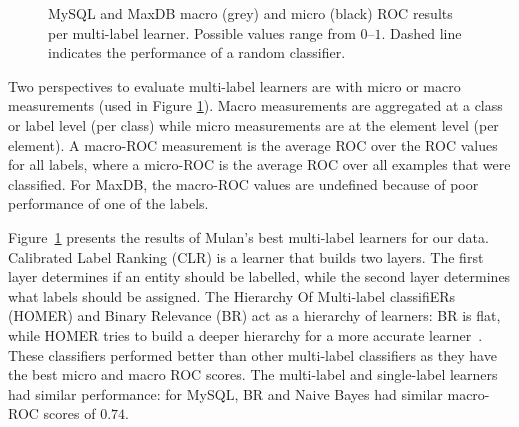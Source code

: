 \documentclass[smallextended]{svjour3}       %
\begin{document}
\begin{figure}[t]
\centering
{}
\caption[]{MySQL and MaxDB macro (grey) and micro (black) ROC results per multi-label learner. Possible values range from $0$--$1$.  Dashed line indicates the performance of a random classifier.
}
\label{fig:mulan}
\end{figure}


Two perspectives to evaluate multi-label learners are with micro or macro measurements (used in Figure \ref{fig:mulan}).
Macro measurements are aggregated at a class or label level (per class) while micro measurements are at the element level (per element).
A macro-ROC measurement is the average ROC over the ROC values for all labels, where a micro-ROC is the average ROC over all examples that were classified. 
For MaxDB, the macro-ROC values are undefined because of poor performance of one of the labels.%

Figure~\ref{fig:mulan} presents the results of Mulan's best multi-label learners for our data. 
Calibrated Label Ranking (CLR) is a learner that builds two layers. The first layer determines if an entity should be labelled, while the second layer determines what labels should be assigned.
The Hierarchy Of Multi-label classifiERs (HOMER) and Binary Relevance (BR) act as a hierarchy of learners: BR is flat, while HOMER tries to build a deeper hierarchy for a more accurate learner~\cite{mulan}. 
These classifiers performed better than other multi-label classifiers as they have the best micro and macro ROC scores. 
The multi-label and single-label learners had similar performance: for
MySQL, BR and Naive Bayes had similar macro-ROC scores of $0.74$.
\end{document}
